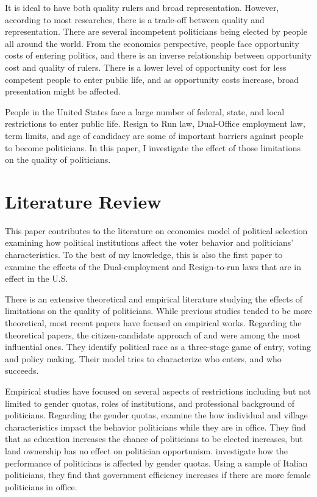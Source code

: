 \documentclass[12pt,english]{article}
\begin{document}
It is ideal to have both quality rulers and broad representation. However, according to most researches, there is a trade-off between quality and representation. There are several incompetent politicians being elected by people all around the world. From the economics perspective, people face opportunity costs of entering politics, and there is an inverse relationship between opportunity cost and quality of rulers. There is a lower level of opportunity cost for less competent people to enter public life, and as opportunity costs increase, broad presentation might be affected.

People in the United States face a large number of federal, state, and local restrictions to enter public life. Resign to Run law, Dual-Office employment law, term limits, and age of candidacy are some of important barriers against people to become politicians. In this paper, I investigate the effect of those limitations on the quality of politicians.



\section{Literature Review}\label{sec:litreview}

This paper contributes to the literature on economics model of political selection examining how political institutions affect the voter behavior and politicians’ characteristics. To the best of my knowledge, this is also the first paper to examine the effects of the Dual-employment and Resign-to-run laws that are in effect in the U.S.

There is an extensive theoretical and empirical literature studying the effects of limitations on the quality of politicians. While previous studies tended to be more theoretical, most recent papers have focused on empirical works. Regarding the theoretical papers, the citizen-candidate approach of \citet{10.2307/2951277} and \citet{10.2307/2946658} were among the most influential ones. They identify political race as a three-stage game of entry, voting and policy making. Their model tries to characterize who enters, and who succeeds.

Empirical studies have focused on several aspects of restrictions including but not limited to gender quotas, roles of institutions, and professional background of politicians.
Regarding the gender quotas, \cite{doi:10.1111/j.1468-0262.2004.00539.x}  examine the 
how individual and village characteristics impact the behavior politicians while they are in office. They find that as education increases the chance of politicians to be elected increases, but land ownership has no effect on politician opportunism. \cite{BRAGA20171} investigate how the performance of politicians is affected by gender quotas. Using a sample of Italian politicians, they find that government eﬃciency increases if there are more female politicians in office. 
\end{document}
